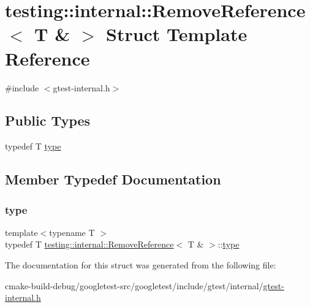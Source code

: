 \hypertarget{structtesting_1_1internal_1_1RemoveReference_3_01T_01_6_01_4}{}\section{testing\+::internal\+::Remove\+Reference$<$ T \& $>$ Struct Template Reference}
\label{structtesting_1_1internal_1_1RemoveReference_3_01T_01_6_01_4}


{\ttfamily \#include $<$gtest-\/internal.\+h$>$}

\subsection*{Public Types}
\begin{DoxyCompactItemize}
\item 
typedef T \mbox{\hyperlink{structtesting_1_1internal_1_1RemoveReference_3_01T_01_6_01_4_a3d0f32a66759f333c2dd66aa31005e6d}{type}}
\end{DoxyCompactItemize}


\subsection{Member Typedef Documentation}
\mbox{\label{structtesting_1_1internal_1_1RemoveReference_3_01T_01_6_01_4_a3d0f32a66759f333c2dd66aa31005e6d}} 
\subsubsection{\texorpdfstring{type}{type}}
{\footnotesize\ttfamily template$<$typename T $>$ \\
typedef T \mbox{\hyperlink{structtesting_1_1internal_1_1RemoveReference}{testing\+::internal\+::\+Remove\+Reference}}$<$ T \& $>$\+::\mbox{\hyperlink{structtesting_1_1internal_1_1RemoveReference_3_01T_01_6_01_4_a3d0f32a66759f333c2dd66aa31005e6d}{type}}}



The documentation for this struct was generated from the following file\+:\begin{DoxyCompactItemize}
\item 
cmake-\/build-\/debug/googletest-\/src/googletest/include/gtest/internal/\mbox{\hyperlink{gtest-internal_8h}{gtest-\/internal.\+h}}\end{DoxyCompactItemize}
